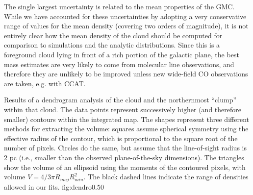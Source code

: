 The single largest uncertainty is related to the mean properties of the GMC.
While we have accounted for these uncertainties by adopting a very conservative
range of values for the mean density (covering two orders of magnitude), it is
not entirely clear how the mean density of the cloud should be computed for
comparison to simulations and the analytic distributions.  Since this is a
foreground cloud lying in front of a rich portion of the galactic plane, the
best mass estimates are very likely to come from molecular line observations,
and therefore they are unlikely to be improved unless new wide-field CO
observations are taken, e.g. with CCAT.

{Results of a dendrogram analysis of the \GRSMC cloud and the
northernmost \thirteenco ``clump'' within that cloud.  The data points represent
successively higher (and therefore smaller) contours within the integrated \thirteenco
map.  The shapes represent three different methods
for extracting the volume: squares assume spherical symmetry using the
effective radius of the contour, which is proportional to the square root of
the number of pixels.  Circles do the same, but assume that the line-of-sight
radius is 2 pc (i.e., smaller than the observed plane-of-the-sky
dimensions).  The triangles show the volume of an ellipsoid using the moments of the
contoured pixels, with volume $V=4/3 \pi R_{maj}R_{min}^2$.  The black dashed lines
indicate the range of densities allowed in our fits.}
{fig:dendro}{0.5}{0}


